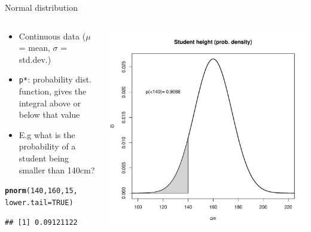 \documentclass[aspectratio=169]{beamer}\usepackage[]{graphicx}\usepackage[]{color}
\makeatletter
\def\maxwidth{ %
  \ifdim\Gin@nat@width>\linewidth
    \linewidth
  \else
    \Gin@nat@width
  \fi
}
\newcommand{\hlnum}[1]{\textcolor[rgb]{0.686,0.059,0.569}{#1}}%
\newcommand{\hlstd}[1]{\textcolor[rgb]{0.345,0.345,0.345}{#1}}%
\newcommand{\hlkwc}[1]{\textcolor[rgb]{0.333,0.667,0.333}{#1}}%
\newcommand{\hlkwd}[1]{\textcolor[rgb]{0.737,0.353,0.396}{\textbf{#1}}}%
\newenvironment{kframe}{%
 \def\at@end@of@kframe{}%
 \ifinner\ifhmode%
  \def\at@end@of@kframe{\end{minipage}}%
  \begin{minipage}{\columnwidth}%
 \fi\fi%
 \def\FrameCommand##1{\hskip\@totalleftmargin \hskip-\fboxsep
 \colorbox{shadecolor}{##1}\hskip-\fboxsep
     \hskip-\linewidth \hskip-\@totalleftmargin \hskip\columnwidth}%
 \MakeFramed {\advance\hsize-\width
   \@totalleftmargin\z@ \linewidth\hsize
   \@setminipage}}%
 {\par\unskip\endMakeFramed%
 \at@end@of@kframe}
\newenvironment{knitrout}{}{} %
\makeatother
\begin{document}
\begin{frame}[fragile]{Normal distribution}
\begin{columns}
  \begin{column}{0.5\textwidth}
  \begin{itemize}
    \item Continuous data ($\mu$ = mean, $\sigma$ = std.dev.)
    \item \texttt{p*}: probability dist. function, gives the integral above or below that value
    \item E.g what is the probability of a student being smaller than 140cm?
  \end{itemize}
\begin{knitrout}\scriptsize
{}\color{fgcolor}\begin{kframe}
\begin{alltt}
\hlkwd{pnorm}\hlstd{(}\hlnum{140}\hlstd{,} \hlnum{160}\hlstd{,} \hlnum{15}\hlstd{,}
      \hlkwc{lower.tail} \hlstd{=} \hlnum{TRUE}\hlstd{)}
\end{alltt}
\begin{verbatim}
## [1] 0.09121122
\end{verbatim}
\end{kframe}
\end{knitrout}
  \end{column}
  \begin{column}{0.5\textwidth}
\begin{knitrout}\scriptsize
{}\color{fgcolor}
\includegraphics[width=\maxwidth]{figure/unnamed-chunk-14-1} 

\end{knitrout}
  \end{column}
\end{columns}
\end{frame}
\end{document}
